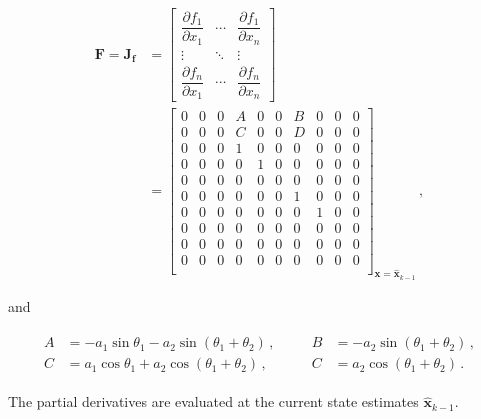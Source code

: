 \begin{equation}
\begin{split}
\mathbf{F} = \mathbf{J}_{\mathbf{f}} &= \begin{bmatrix}
    \dfrac{\partial f_1}{\partial x_1} & \cdots & \dfrac{\partial f_1}{\partial x_{n}}\\
    \vdots & \ddots & \vdots\\
    \dfrac{\partial f_{n}}{\partial x_1} & \cdots & \dfrac{\partial f_{n}}{\partial x_{n}} \end{bmatrix} \\
&=\begin{bmatrix}
  0 & 0 & 0 & A & 0 & 0 & B & 0 & 0 & 0\\
  0 & 0 & 0 & C & 0 & 0 & D & 0 & 0 & 0\\
  0 & 0 & 0 & 1 & 0 & 0 & 0 & 0 & 0 & 0\\
  0 & 0 & 0 & 0 & 1 & 0 & 0 & 0 & 0 & 0\\
  0 & 0 & 0 & 0 & 0 & 0 & 0 & 0 & 0 & 0\\
  0 & 0 & 0 & 0 & 0 & 0 & 1 & 0 & 0 & 0\\
  0 & 0 & 0 & 0 & 0 & 0 & 0 & 1 & 0 & 0\\
  0 & 0 & 0 & 0 & 0 & 0 & 0 & 0 & 0 & 0\\
  0 & 0 & 0 & 0 & 0 & 0 & 0 & 0 & 0 & 0\\
  0 & 0 & 0 & 0 & 0 & 0 & 0 & 0 & 0 & 0\\
\end{bmatrix}_{\mathbf{x}=\hat{\mathbf{x}}_{k-1}}\,,
\end{split}
\end{equation}

\noindent
and

\begin{equation*}
  \begin{array}{cc}
  \begin{split}
  	A &= -a_1 \sin \theta_1 -a_2 \sin (\theta_1 + \theta_2)\,, \quad \\
  	C &= a_1 \cos \theta_1 + a_2 \cos (\theta_1 + \theta_2)\,,
  \end{split} &
  \begin{split}
  B &= -a_2 \sin (\theta_1 + \theta_2)\,, \\
  C &= a_2 \cos (\theta_1 + \theta_2)\,.
  \end{split}
\end{array}
\end{equation*}

\noindent
The partial derivatives are evaluated at the current state estimates $\hat{\mathbf{x}}_{k-1}$.

